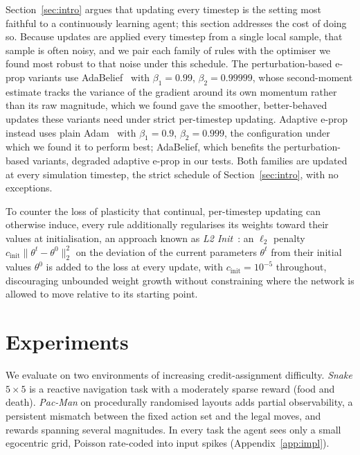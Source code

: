 \documentclass[10pt,twocolumn]{article}
\newcommand{\method}{perturbation-based e-prop}   %
\begin{document}
Section~\ref{sec:intro} argues that updating every timestep is the setting
most faithful to a continuously learning agent; this section addresses the
cost of doing so.
Because updates are applied every timestep from a single local sample, that
sample is often noisy, and we pair each family of rules with the optimiser we
found most robust to that noise under this schedule. The \method{}
variants use AdaBelief~\citep{zhuang2020adabelief} with $\beta_1=0.99$,
$\beta_2=0.99999$, whose second-moment estimate tracks the variance of the
gradient around its own momentum rather than its raw magnitude, which we
found gave the smoother, better-behaved updates these variants need under
strict per-timestep updating. Adaptive e-prop instead uses plain
Adam~\citep{kingma2014adam} with $\beta_1=0.9$, $\beta_2=0.999$, the
configuration under which we found it to perform best; AdaBelief, which
benefits the perturbation-based variants, degraded adaptive e-prop in our tests. Both families are
updated at every simulation timestep, the strict schedule of
Section~\ref{sec:intro}, with no exceptions.

To counter the loss of plasticity that continual, per-timestep updating can
otherwise induce, every rule additionally regularises its weights toward
their values at initialisation, an approach known as \emph{L2
Init}~\citep{kumar2023maintaining}: an $\ell_2$ penalty
$c_{\mathrm{init}}\lVert\theta^t-\theta^0\rVert_2^2$ on the deviation of the
current parameters $\theta^t$ from their initial values $\theta^0$ is added
to the loss at every update, with $c_{\mathrm{init}}=10^{-5}$ throughout,
discouraging unbounded weight growth without constraining where the network
is allowed to move relative to its starting point.
\section{Experiments}
\label{sec:results}

We evaluate on two environments of increasing credit-assignment difficulty.
\emph{Snake} $5\times5$ is a reactive navigation task with a moderately sparse
reward (food and death). \emph{Pac-Man} on procedurally randomised layouts adds
partial observability, a persistent mismatch between the fixed action set and
the legal moves, and rewards spanning several magnitudes. In every task the agent sees only a small egocentric
grid, Poisson rate-coded into input spikes (Appendix~\ref{app:impl}).
\end{document}

